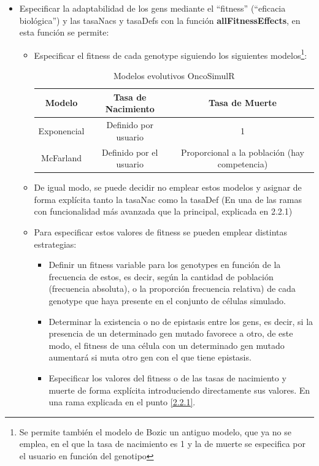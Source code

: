 \begin{itemize}
	\item Especificar la adaptabilidad de los \glspl{gen} mediante el ``\gls{fitness}'' (``eficacia biológica'') y las \glspl{tasaNac} y \glspl{tasaDef} con la función \textbf{allFitnessEffects}, en esta función se permite:
	\begin{itemize}
		\item Especificar el \gls{fitness} de cada \gls{genotype} siguiendo los siguientes modelos\footnote{Se permite también el modelo de Bozic\cite{Bozic} un antiguo modelo, que ya no se emplea, en el que la tasa de nacimiento es 1 y la de muerte se especifica por el usuario en función del genotipo}: \\
		\begin{table}[h]
			\begin{tabular}{|c||c|c|}
				\hline
				\textbf{Modelo} & \textbf{Tasa de Nacimiento} & \textbf{Tasa de Muerte} \\ \hline
				Exponencial & Definido por usuario & 1\\ \hline
				McFarland\cite{McFarland} & Definido por el usuario & Proporcional a la población (hay competencia)\\ \hline
			\end{tabular}
			\caption{Modelos evolutivos OncoSimulR}
			\label{tab:modelos}
		\end{table}
		\item De igual modo, se puede decidir no emplear estos modelos y asignar de forma explícita tanto la \gls{tasaNac} como la \gls{tasaDef} (En una de las ramas con funcionalidad más avanzada que la principal, explicada en 2.2.1)\cite{Alberto}
		\item Para especificar estos valores de fitness se pueden emplear distintas estrategias:
		\begin{itemize}
			\item Definir un \gls{fitness} variable para los \glspl{genotype}  en función de la frecuencia de estos, es decir, según la cantidad de población (frecuencia absoluta), o la proporción frecuencia relativa) de cada \gls{genotype} que haya presente en el conjunto de células simulado.
			\item Determinar la existencia o no de \gls{epistasis} entre los \glspl{gen}, es decir, si la presencia de un determinado \gls{gen} mutado favorece a otro, de este modo, el \gls{fitness} de una célula con un determinado \gls{gen} mutado aumentará si muta otro \gls{gen} con el que tiene \gls{epistasis}.
			\item Especificar los valores del fitness o de las tasas de nacimiento y muerte de forma explícita introduciendo directamente sus valores. En una rama explicada en el punto \ref{2.2.1}.

\end{itemize}
\end{itemize}
\end{itemize}
